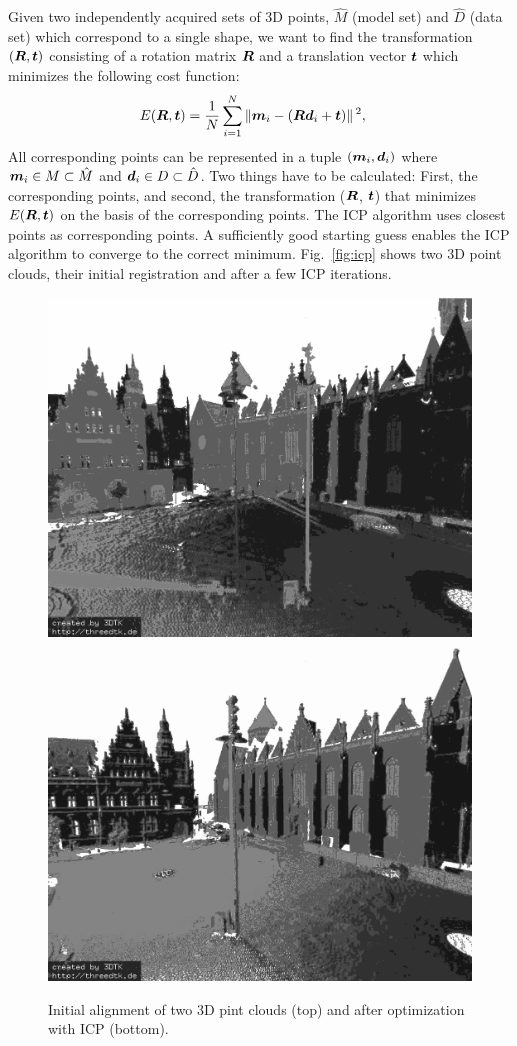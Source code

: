 \documentclass[twocolumn,oneside]{book}
\newcommand{\V}[1]{\vector{#1}}  %
\newcommand{\M}[1]{\V{#1}}    %
\begin{document}
Given two independently acquired sets of 3D points, $\hat M$ (model
set) and $\hat D$ (data set) which correspond to a single shape, we
want to find the transformation $(\M R, \V t)$ consisting of a
rotation matrix $\M R$ and a translation vector $\V t$ which minimizes
the following cost function:
\begin{align}
E(\M R, \V t) & = \frac{1}{N} \sum_{i=1}^N \norm{\V m_i - (\M R \V d_i
 + \V t)}^2, \label{DMin}
\end{align}
All corresponding points can be represented in a tuple $(\V m_i,\V
d_i)$ where $\V m_i \in M \subset \hat M$ and $\V d_i \in D \subset
\hat D$. Two things have to be calculated: First, the corresponding
points, and second, the transformation ($\M R$, $\V t$) that minimizes
$E(\M R, \V t)$ on the basis of the corresponding points. The ICP
algorithm uses closest points as corresponding points. A sufficiently
good starting guess enables the ICP algorithm to converge to the
correct minimum. Fig.~\ref{fig:icp} shows two 3D point clouds, their
initial registration and after a few ICP iterations.
\begin{figure}
  \centering
\includegraphics[width=0.75\linewidth]{BOOKFIGS/start_1}\\
\includegraphics[width=0.75\linewidth]{BOOKFIGS/final_1}
\caption{Initial alignment of two 3D pint clouds (top) and after
  optimization with ICP (bottom).}
\end{figure}  
\end{document}
